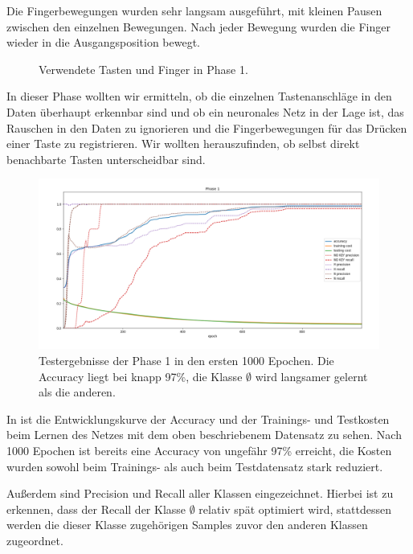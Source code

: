 Die Fingerbewegungen wurden sehr langsam ausgeführt, mit kleinen Pausen zwischen den einzelnen Bewegungen. Nach jeder Bewegung wurden die Finger wieder in die Ausgangsposition bewegt.

\begin{figure}[h]
    \centering
    \caption[Tasten und Finger in Phase 1]{Verwendete Tasten und Finger in Phase 1.}
\end{figure}

In dieser Phase wollten wir ermitteln, ob die einzelnen Tastenanschläge in den Daten überhaupt erkennbar sind und ob ein neuronales Netz in der Lage ist, das Rauschen in den Daten zu ignorieren und die Fingerbewegungen für das Drücken einer Taste zu registrieren. Wir wollten herauszufinden, ob selbst direkt benachbarte Tasten unterscheidbar sind.

\begin{figure}
    \includegraphics[width=\textwidth]{../common/images/phase-1-detailed.png}
    \caption[Testergebnisse Phase 1]{Testergebnisse der Phase 1 in den ersten \num{1000} Epochen. Die Accuracy liegt bei knapp 97\%, die Klasse $\emptyset$ wird langsamer gelernt als die anderen.}
\end{figure}

In  ist die Entwicklungskurve der Accuracy und der Trainings- und Testkosten beim Lernen des Netzes mit dem oben beschriebenem Datensatz zu sehen. Nach \num{1000} Epochen ist bereits eine Accuracy von ungefähr 97\% erreicht, die Kosten wurden sowohl beim Trainings- als auch beim Testdatensatz stark reduziert.

Außerdem sind Precision und Recall aller Klassen eingezeichnet. Hierbei ist zu erkennen, dass der Recall der Klasse $\emptyset$ relativ spät optimiert wird, stattdessen werden die dieser Klasse zugehörigen Samples zuvor den anderen Klassen zugeordnet.

